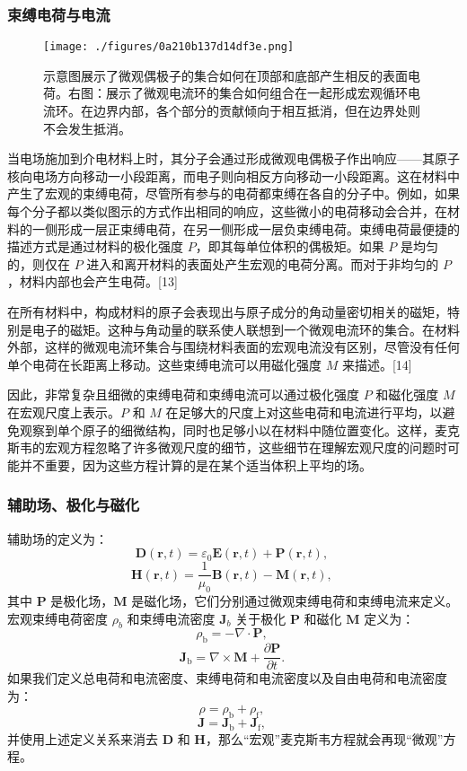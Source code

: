 \subsubsection{束缚电荷与电流}  
\begin{figure}[ht]
\centering
\texttt{[image: ./figures/0a210b137d14df3e.png]}
\caption{示意图展示了微观偶极子的集合如何在顶部和底部产生相反的表面电荷。右图：展示了微观电流环的集合如何组合在一起形成宏观循环电流环。在边界内部，各个部分的贡献倾向于相互抵消，但在边界处则不会发生抵消。} \label{fig_MAXS_10}
\end{figure}
当电场施加到介电材料上时，其分子会通过形成微观电偶极子作出响应——其原子核向电场方向移动一小段距离，而电子则向相反方向移动一小段距离。这在材料中产生了宏观的束缚电荷，尽管所有参与的电荷都束缚在各自的分子中。例如，如果每个分子都以类似图示的方式作出相同的响应，这些微小的电荷移动会合并，在材料的一侧形成一层正束缚电荷，在另一侧形成一层负束缚电荷。束缚电荷最便捷的描述方式是通过材料的极化强度 \( P \)，即其每单位体积的偶极矩。如果 \( P \) 是均匀的，则仅在 \( P \) 进入和离开材料的表面处产生宏观的电荷分离。而对于非均匀的 \( P \)，材料内部也会产生电荷。[13]

在所有材料中，构成材料的原子会表现出与原子成分的角动量密切相关的磁矩，特别是电子的磁矩。这种与角动量的联系使人联想到一个微观电流环的集合。在材料外部，这样的微观电流环集合与围绕材料表面的宏观电流没有区别，尽管没有任何单个电荷在长距离上移动。这些束缚电流可以用磁化强度 \( M \) 来描述。[14]

因此，非常复杂且细微的束缚电荷和束缚电流可以通过极化强度 \( P \) 和磁化强度 \( M \) 在宏观尺度上表示。\( P \) 和 \( M \) 在足够大的尺度上对这些电荷和电流进行平均，以避免观察到单个原子的细微结构，同时也足够小以在材料中随位置变化。这样，麦克斯韦的宏观方程忽略了许多微观尺度的细节，这些细节在理解宏观尺度的问题时可能并不重要，因为这些方程计算的是在某个适当体积上平均的场。
\subsubsection{辅助场、极化与磁化}
辅助场的定义为：
\[
\mathbf{D}(\mathbf{r}, t) = \varepsilon_0 \mathbf{E}(\mathbf{r}, t) + \mathbf{P}(\mathbf{r}, t),~
\]
\[
\mathbf{H}(\mathbf{r}, t) = \frac{1}{\mu_0} \mathbf{B}(\mathbf{r}, t) - \mathbf{M}(\mathbf{r}, t),~
\]
其中 \(\mathbf{P}\) 是极化场，\(\mathbf{M}\) 是磁化场，它们分别通过微观束缚电荷和束缚电流来定义。宏观束缚电荷密度 \(\rho_b\) 和束缚电流密度 \(\mathbf{J}_b\) 关于极化 \(\mathbf{P}\) 和磁化 \(\mathbf{M}\) 定义为：
\[
\rho_{\text{b}} = -\nabla \cdot \mathbf{P},~
\]
\[
\mathbf{J}_{\text{b}} = \nabla \times \mathbf{M} + \frac{\partial \mathbf{P}}{\partial t}.~
\]
如果我们定义总电荷和电流密度、束缚电荷和电流密度以及自由电荷和电流密度为：
\[
\rho = \rho_{\text{b}} + \rho_{\text{f}},~
\]
\[
\mathbf{J} = \mathbf{J}_{\text{b}} + \mathbf{J}_{\text{f}},~
\]
并使用上述定义关系来消去 \(\mathbf{D}\) 和 \(\mathbf{H}\)，那么“宏观”麦克斯韦方程就会再现“微观”方程。
